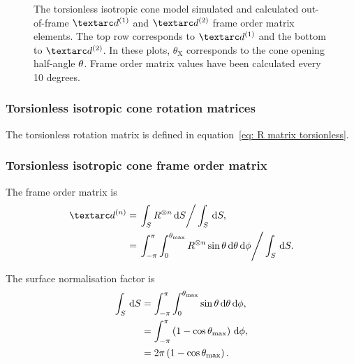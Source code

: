 \begin{figure}
\begin{tabular}{@{}cc@{}}
  \end{tabular}
  \caption[Torsionless isotropic cone simulated and calculated out-of-frame Daeg$^{(1)}$ and Daeg$^{(2)}$ elements.]{
    The torsionless isotropic cone model simulated and calculated out-of-frame $\FOone$ and $\FOtwo$ frame order matrix elements.
    The top row corresponds to $\FOone$ and the bottom to $\FOtwo$.
    In these plots, $\theta_\textrm{X}$ corresponds to the cone opening half-angle $\theta$.
    Frame order matrix values have been calculated every 10 degrees.
  }
  \label{fig: simulated and calculated out-of-frame 1st and 2nd degree iso cone, torsionless frame order}
\end{figure}


\subsubsection{Torsionless isotropic cone rotation matrices}

The torsionless rotation matrix is defined in equation~\ref{eq: R matrix torsionless}.


\subsubsection{Torsionless isotropic cone frame order matrix}

The frame order matrix is
\begin{subequations}
\begin{align}
    \FOn &= \left. \int_S R^{\otimes n} \diff S \right / \int_S \diff S , \\
         &= \left. \int_{-\pi}^{\pi} \int_{0}^{\conethetamax} R^{\otimes n} \sin\theta \diff\theta \diff\phi  \right / \int_S \diff S .
\end{align}
\end{subequations}

The surface normalisation factor is
\begin{subequations}
\begin{align}
    \int_S \,\mathrm{d} S &= \int_{-\pi}^{\pi} \int_{0}^{\theta_\textrm{max}} \sin\theta \,\mathrm{d}\theta \,\mathrm{d}\phi , \\
                   &= \int_{-\pi}^{\pi} \left( 1 - \cos\theta_\textrm{max} \right) \,\mathrm{d}\phi , \\
                   &= 2\pi \left( 1 - \cos\theta_\textrm{max} \right) .
\end{align}
\end{subequations}


